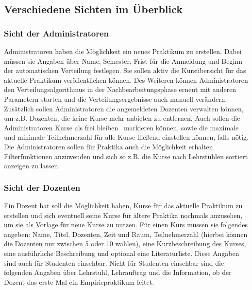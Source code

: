             
            
                    
        \subsection{Verschiedene Sichten im Überblick}
        \label{Sichten}
            \subsubsection{Sicht der Administratoren}
                Administratoren haben die Möglichkeit ein neues Praktikum zu erstellen.
                Dabei müssen sie Angaben über Name, Semester, Frist für die Anmeldung und Beginn der automatischen Verteilung festlegen.
                Sie sollen aktiv die Kursübersicht für das aktuelle Praktikum veröffentlichen können.
                Des Weiteren können Administratoren den Verteilungsalgorithmus in der Nachbearbeitungsphase erneut mit anderen Parametern starten und die Verteilungsergebnisse auch manuell verändern.
                Zusätzlich sollen Administratoren die angemeldeten Dozenten verwalten können, um z.B. Dozenten, die keine Kurse mehr anbieten zu entfernen.
                Auch sollen die Administratoren Kurse als \glqq frei bleiben\grqq~ markieren können, sowie die maximale und minimale Teilnehmerzahl für alle Kurse fließend einstellen können, falls nötig.
                Die Administratoren sollen für Praktika auch die Möglichkeit erhalten Filterfunktionen anzuwenden und sich so z.B. die Kurse nach Lehrstühlen sortiert anzeigen zu lassen.
            
            \subsubsection{Sicht der Dozenten}
                Ein Dozent hat soll die Möglichkeit haben, Kurse für das aktuelle Praktikum zu erstellen und sich eventuell seine Kurse für ältere Praktika nochmals anzusehen, um sie als Vorlage für neue Kurse zu nutzen. 
                Für einen Kurs müssen sie folgendes angeben: Name, Titel, Dozenten, Zeit und Raum, Teilnehmerzahl (hierbei können die Dozenten nur zwischen 5 oder 10 wählen), eine Kurzbeschreibung des Kurses, eine ausführliche Beschreibung und optional eine Literaturliste.
                Diese Angaben sind auch für Studenten einsehbar.
                Nicht für Studenten einsehbar sind die folgenden Angaben über Lehrstuhl, Lehrauftrag und die Information, ob der Dozent das erste Mal ein Empiriepraktikum leitet.
                
